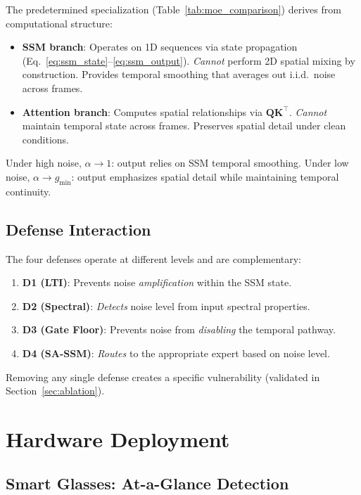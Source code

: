 \documentclass[conference]{IEEEtran}
\begin{document}
The predetermined specialization (Table~\ref{tab:moe_comparison}) derives from computational structure:
\begin{itemize}
\item \textbf{SSM branch}: Operates on 1D sequences via state propagation (Eq.~\ref{eq:ssm_state}--\ref{eq:ssm_output}). \emph{Cannot} perform 2D spatial mixing by construction. Provides temporal smoothing that averages out i.i.d.\ noise across frames.
\item \textbf{Attention branch}: Computes spatial relationships via $\mathbf{Q}\mathbf{K}^\top$. \emph{Cannot} maintain temporal state across frames. Preserves spatial detail under clean conditions.
\end{itemize}

Under high noise, $\alpha \to 1$: output relies on SSM temporal smoothing.
Under low noise, $\alpha \to g_{\min}$: output emphasizes spatial detail while maintaining temporal continuity.

\subsection{Defense Interaction}

The four defenses operate at different levels and are complementary:

\begin{enumerate}
\item \textbf{D1 (LTI)}: Prevents noise \emph{amplification} within the SSM state.
\item \textbf{D2 (Spectral)}: \emph{Detects} noise level from input spectral properties.
\item \textbf{D3 (Gate Floor)}: Prevents noise from \emph{disabling} the temporal pathway.
\item \textbf{D4 (SA-SSM)}: \emph{Routes} to the appropriate expert based on noise level.
\end{enumerate}

Removing any single defense creates a specific vulnerability (validated in Section~\ref{sec:ablation}).

\section{Hardware Deployment}
\label{sec:hardware}

\subsection{Smart Glasses: At-a-Glance Detection}
\end{document}
